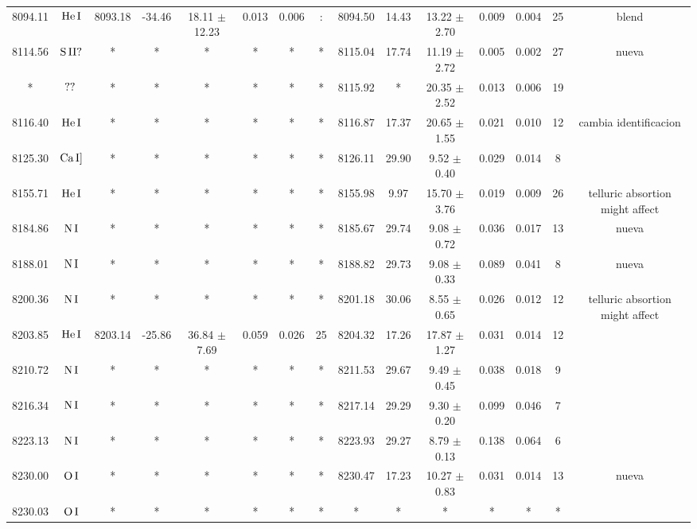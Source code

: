 \documentclass{article}
\begin{document}
\begin{table*}
\begin{adjustbox}{width=\textwidth}
\begin{tabular}{ccccccccccccccc}
8094.11 & $\mbox{He}\thinspace \mbox{I}$ & 8093.18 & -34.46 & 18.11 $\pm$ 12.23 & 0.013 & 0.006 & : & 8094.50 & 14.43 & 13.22 $\pm$ 2.70 & 0.009 & 0.004 & 25 &  blend \\
8114.56 & $\mbox{S}\thinspace \mbox{II?}$ & * & * & * & * & * & * & 8115.04 & 17.74 & 11.19 $\pm$ 2.72 & 0.005 & 0.002 & 27 &  nueva \\
* & $\mbox{??}\thinspace \mbox{}$ & * & * & * & * & * & * & 8115.92 & * & 20.35 $\pm$ 2.52 & 0.013 & 0.006 & 19 &  \\
8116.40 & $\mbox{He}\thinspace \mbox{I}$ & * & * & * & * & * & * & 8116.87 & 17.37 & 20.65 $\pm$ 1.55 & 0.021 & 0.010 & 12 &  cambia identificacion \\
8125.30 & $\mbox{Ca}\thinspace \mbox{I]}$ & * & * & * & * & * & * & 8126.11 & 29.90 & 9.52 $\pm$ 0.40 & 0.029 & 0.014 & 8 &  \\
8155.71 & $\mbox{He}\thinspace \mbox{I}$ & * & * & * & * & * & * & 8155.98 & 9.97 & 15.70 $\pm$ 3.76 & 0.019 & 0.009 & 26 &  telluric absortion might affect \\
8184.86 & $\mbox{N}\thinspace \mbox{I}$ & * & * & * & * & * & * & 8185.67 & 29.74 & 9.08 $\pm$ 0.72 & 0.036 & 0.017 & 13 &  nueva \\
8188.01 & $\mbox{N}\thinspace \mbox{I}$ & * & * & * & * & * & * & 8188.82 & 29.73 & 9.08 $\pm$ 0.33 & 0.089 & 0.041 & 8 &  nueva \\
8200.36 & $\mbox{N}\thinspace \mbox{I}$ & * & * & * & * & * & * & 8201.18 & 30.06 & 8.55 $\pm$ 0.65 & 0.026 & 0.012 & 12 &  telluric absortion might affect \\
8203.85 & $\mbox{He}\thinspace \mbox{I}$ & 8203.14 & -25.86 & 36.84 $\pm$ 7.69 & 0.059 & 0.026 & 25 & 8204.32 & 17.26 & 17.87 $\pm$ 1.27 & 0.031 & 0.014 & 12 &  \\
8210.72 & $\mbox{N}\thinspace \mbox{I}$ & * & * & * & * & * & * & 8211.53 & 29.67 & 9.49 $\pm$ 0.45 & 0.038 & 0.018 & 9 &  \\
8216.34 & $\mbox{N}\thinspace \mbox{I}$ & * & * & * & * & * & * & 8217.14 & 29.29 & 9.30 $\pm$ 0.20 & 0.099 & 0.046 & 7 &  \\
8223.13 & $\mbox{N}\thinspace \mbox{I}$ & * & * & * & * & * & * & 8223.93 & 29.27 & 8.79 $\pm$ 0.13 & 0.138 & 0.064 & 6 &  \\
8230.00 & $\mbox{O}\thinspace \mbox{I}$ & * & * & * & * & * & * & 8230.47 & 17.23 & 10.27 $\pm$ 0.83 & 0.031 & 0.014 & 13 &  nueva \\
8230.03 & $\mbox{O}\thinspace \mbox{I}$ & * & * & * & * & * & * & * & * & * & * & * & * &  \\

\end{tabular}
\end{adjustbox}
\end{table*}
\end{document}
